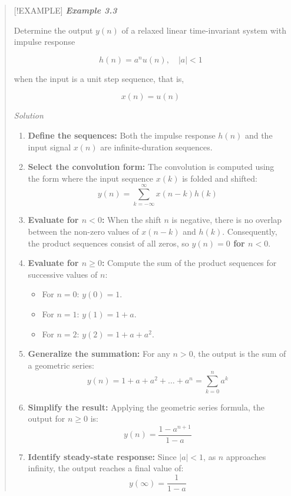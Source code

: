 \begin{quote}
{[}!EXAMPLE{]} \textbf{\emph{Example 3.3}}

Determine the output \(y(n)\) of a relaxed linear time-invariant system
with impulse response

\[h(n) = a^n u(n), \quad |a| < 1\]

when the input is a unit step sequence, that is,

\[x(n) = u(n)\]

\emph{Solution}

\begin{enumerate}
\def\labelenumi{\arabic{enumi}.}
\setcounter{enumi}{4}
\tightlist
\item
  \textbf{Define the sequences:} Both the impulse response \(h(n)\) and
  the input signal \(x(n)\) are infinite-duration sequences.
\item
  \textbf{Select the convolution form:} The convolution is computed
  using the form where the input sequence \(x(k)\) is folded and
  shifted: \[y(n) = \sum_{k=-\infty}^{\infty} x(n-k)h(k)\]
\item
  \textbf{Evaluate for \(n < 0\):} When the shift \(n\) is negative,
  there is no overlap between the non-zero values of \(x(n-k)\) and
  \(h(k)\). Consequently, the product sequences consist of all zeros, so
  \textbf{\(y(n) = 0\) for \(n < 0\)}.
\item
  \textbf{Evaluate for \(n \ge 0\):} Compute the sum of the product
  sequences for successive values of \(n\):

  \begin{itemize}
  \tightlist
  \item
    For \(n=0\): \(y(0) = 1\).
  \item
    For \(n=1\): \(y(1) = 1 + a\).
  \item
    For \(n=2\): \(y(2) = 1 + a + a^2\).
  \end{itemize}
\item
  \textbf{Generalize the summation:} For any \(n > 0\), the output is
  the sum of a geometric series:
  \[y(n) = 1 + a + a^2 + \dots + a^n = \sum_{k=0}^{n} a^k\]
\item
  \textbf{Simplify the result:} Applying the geometric series formula,
  the output for \(n \ge 0\) is: \[y(n) = \frac{1 - a^{n+1}}{1 - a}\]
\item
  \textbf{Identify steady-state response:} Since \(|a| < 1\), as \(n\)
  approaches infinity, the output reaches a final value of:
  \[y(\infty) = \frac{1}{1 - a}\]
\end{enumerate}
\end{quote}

